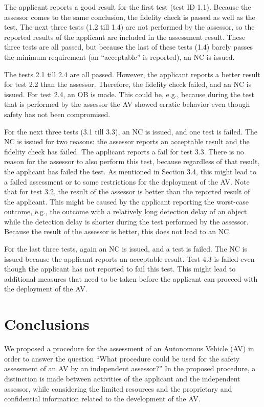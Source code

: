 \documentclass[twoside,twocolumn,9pt]{article}
\theoremstyle{plain}
\theoremstyle{remark}\newtheorem{remarkenv}{Remark}        %
\begin{document}
The applicant reports a good result for the first test (test ID 1.1). Because the assessor comes to the same conclusion, the fidelity check is passed as well as the test. The next three tests (1.2 till 1.4) are not performed by the assessor, so the reported results of the applicant are included in the assessment result. These three tests are all passed, but because the last of these tests (1.4) barely passes the minimum requirement (an “acceptable” is reported), an NC is issued.

The tests 2.1 till 2.4 are all passed. However, the applicant reports a better result for test 2.2 than the assessor. Therefore, the fidelity check failed, and an NC is issued. For test 2.4, an OB is made. This could be, e.g., because during the test that is performed by the assessor the AV showed erratic behavior even though safety has not been compromised.

For the next three tests (3.1 till 3.3), an NC is issued, and one test is failed. The NC is issued for two reasons: the assessor reports an acceptable result and the fidelity check has failed. The applicant reports a fail for test 3.3. There is no reason for the assessor to also perform this test, because regardless of that result, the applicant has failed the test. As mentioned in Section 3.4, this might lead to a failed assessment or to some restrictions for the deployment of the AV. Note that for test 3.2, the result of the assessor is better than the reported result of the applicant. This might be caused by the applicant reporting the worst-case outcome, e.g., the outcome with a relatively long detection delay of an object while the detection delay is shorter during the test performed by the assessor. Because the result of the assessor is better, this does not lead to an NC.

For the last three tests, again an NC is issued, and a test is failed. The NC is issued because the applicant reports an acceptable result. Test 4.3 is failed even though the applicant has not reported to fail this test. This might lead to additional measures that need to be taken before the applicant can proceed with the deployment of the AV.


\section{Conclusions}
\label{sec:conclusions}

We proposed a procedure for the assessment of an Autonomous Vehicle (AV) in order to answer the question ``What procedure could be used for the safety assessment of an AV by an independent assessor?''
In the proposed procedure, a distinction is made between activities of the applicant and the independent assessor, while considering the limited resources and the proprietary and confidential information related to the development of the AV.
\end{document}
